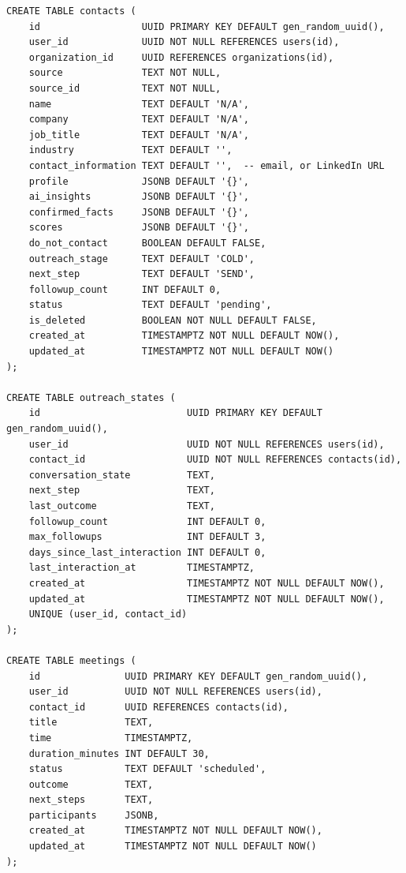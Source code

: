 \documentclass[a4paper]{article}
\begin{document}
\begin{tcolorbox}[sqlstyle, title=Contact Management]
\begin{Verbatim}[fontsize=\small]
CREATE TABLE contacts (
    id                  UUID PRIMARY KEY DEFAULT gen_random_uuid(),
    user_id             UUID NOT NULL REFERENCES users(id),
    organization_id     UUID REFERENCES organizations(id),
    source              TEXT NOT NULL,
    source_id           TEXT NOT NULL,
    name                TEXT DEFAULT 'N/A',
    company             TEXT DEFAULT 'N/A',
    job_title           TEXT DEFAULT 'N/A',
    industry            TEXT DEFAULT '',
    contact_information TEXT DEFAULT '',  -- email, or LinkedIn URL
    profile             JSONB DEFAULT '{}',
    ai_insights         JSONB DEFAULT '{}',
    confirmed_facts     JSONB DEFAULT '{}',
    scores              JSONB DEFAULT '{}',
    do_not_contact      BOOLEAN DEFAULT FALSE,
    outreach_stage      TEXT DEFAULT 'COLD',
    next_step           TEXT DEFAULT 'SEND',
    followup_count      INT DEFAULT 0,
    status              TEXT DEFAULT 'pending',
    is_deleted          BOOLEAN NOT NULL DEFAULT FALSE,
    created_at          TIMESTAMPTZ NOT NULL DEFAULT NOW(),
    updated_at          TIMESTAMPTZ NOT NULL DEFAULT NOW()
);

CREATE TABLE outreach_states (
    id                          UUID PRIMARY KEY DEFAULT gen_random_uuid(),
    user_id                     UUID NOT NULL REFERENCES users(id),
    contact_id                  UUID NOT NULL REFERENCES contacts(id),
    conversation_state          TEXT,
    next_step                   TEXT,
    last_outcome                TEXT,
    followup_count              INT DEFAULT 0,
    max_followups               INT DEFAULT 3,
    days_since_last_interaction INT DEFAULT 0,
    last_interaction_at         TIMESTAMPTZ,
    created_at                  TIMESTAMPTZ NOT NULL DEFAULT NOW(),
    updated_at                  TIMESTAMPTZ NOT NULL DEFAULT NOW(),
    UNIQUE (user_id, contact_id)
);

CREATE TABLE meetings (
    id               UUID PRIMARY KEY DEFAULT gen_random_uuid(),
    user_id          UUID NOT NULL REFERENCES users(id),
    contact_id       UUID REFERENCES contacts(id),
    title            TEXT,
    time             TIMESTAMPTZ,
    duration_minutes INT DEFAULT 30,
    status           TEXT DEFAULT 'scheduled',
    outcome          TEXT,
    next_steps       TEXT,
    participants     JSONB,
    created_at       TIMESTAMPTZ NOT NULL DEFAULT NOW(),
    updated_at       TIMESTAMPTZ NOT NULL DEFAULT NOW()
);
\end{Verbatim}
\end{tcolorbox}
\end{document}
